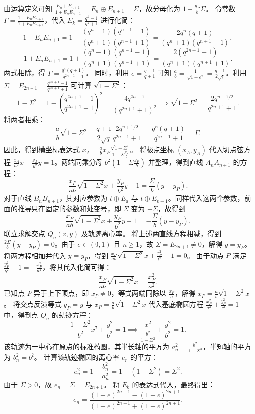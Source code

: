\begin{solution}
由运算定义可知 $\frac{E_n+E_{n+1}}{1+E_n E_{n+1}} = E_n \oplus E_{n+1} = \Sigma$，故分母化为 $1 - \frac{y_P}{b} \Sigma$。
令常数 $\Gamma = \frac{1-E_n E_{n+1}}{1+E_n E_{n+1}}$，代入 $E_k = \frac{q^k-1}{q^k+1}$ 进行化简：
\[ 1-E_n E_{n+1} = 1 - \frac{(q^n-1)(q^{n+1}-1)}{(q^n+1)(q^{n+1}+1)} = \frac{2q^n(q+1)}{(q^n+1)(q^{n+1}+1)}, \]
\[ 1+E_n E_{n+1} = 1 + \frac{(q^n-1)(q^{n+1}-1)}{(q^n+1)(q^{n+1}+1)} = \frac{2(q^{2n+1}+1)}{(q^n+1)(q^{n+1}+1)}. \]
两式相除，得 $\Gamma = \frac{q^n(q+1)}{q^{2n+1}+1}$。
同时，利用 $e = \frac{q-1}{q+1}$ 可知 $\frac{a}{b} = \frac{1}{\sqrt{1-e^2}} = \frac{q+1}{2\sqrt{q}}$。利用 $\Sigma = E_{2n+1} = \frac{q^{2n+1}-1}{q^{2n+1}+1}$ 可计算 $\sqrt{1-\Sigma^2}$：
\[ 1-\Sigma^2 = 1 - \left(\frac{q^{2n+1}-1}{q^{2n+1}+1}\right)^2 = \frac{4q^{2n+1}}{(q^{2n+1}+1)^2} \implies \sqrt{1-\Sigma^2} = \frac{2q^{n+1/2}}{q^{2n+1}+1}. \]
将两者相乘：
\[ \frac{a}{b} \sqrt{1-\Sigma^2} = \frac{q+1}{2\sqrt{q}} \frac{2q^{n+1/2}}{q^{2n+1}+1} = \frac{q^n(q+1)}{q^{2n+1}+1} = \Gamma. \]
因此，得到横坐标表达式 $x_A = \frac{a}{b} x_P \frac{\sqrt{1-\Sigma^2}}{1 - \Sigma\frac{y_P}{b}}$。
将极点坐标 $(x_A, y_A)$ 代入切点弦方程 $\frac{x_A}{a^2}x + \frac{y_A}{b^2}y = 1$。两端同乘分母 $b^2\left(1 - \Sigma\frac{y_P}{b}\right)$ 并整理，得到直线 $A_n A_{n+1}$ 的方程：
\[ \frac{x_P}{ab}\sqrt{1-\Sigma^2} x + \frac{y_P}{b^2}y - 1 = \frac{\Sigma}{b}(y - y_P). \]
对于直线 $B_n B_{n+1}$，其对应参数为 $t \oplus E_n$ 与 $t \oplus E_{n+1}$。同样代入这两个参数，前面的推导只在固定的参数和处变号，即 $\Sigma$ 变为 $-\Sigma$，故得到
\[ \frac{x_P}{ab}\sqrt{1-\Sigma^2} x + \frac{y_P}{b^2}y - 1 = -\frac{\Sigma}{b}(y - y_P). \]
联立求解交点 $Q_n(x,y)$ 及轨迹离心率。
将上述两直线方程相减，得到 $\frac{2\Sigma}{b}(y - y_P) = 0$。由于 $e \in (0, 1)$ 且 $n \ge 1$，故 $\Sigma = E_{2n+1} \neq 0$，解得 $y = y_P$。
将两方程相加并代入 $y = y_P$，得到 $\frac{x_P}{ab}\sqrt{1-\Sigma^2} x + \frac{y_P^2}{b^2} - 1 = 0$。
由于动点 $P$ 满足 $\frac{y_P^2}{b^2} - 1 = -\frac{x_P^2}{a^2}$，将其代入化简可得：
\[ \frac{x_P}{ab}\sqrt{1-\Sigma^2} x = \frac{x_P^2}{a^2}. \]
已知点 $P$ 异于上下顶点，即 $x_P \neq 0$，等式两端同除以 $\frac{x_P}{a}$，解得 $x_P = \frac{a}{b}\sqrt{1-\Sigma^2} x$。
将交点反演等式 $y_P = y$ 与 $x_P = \frac{a}{b}\sqrt{1-\Sigma^2} x$ 代入基底椭圆方程 $\frac{x_P^2}{a^2} + \frac{y_P^2}{b^2} = 1$ 中，得到点 $Q_n$ 的轨迹方程：
\[ \frac{1-\Sigma^2}{b^2} x^2 + \frac{y^2}{b^2} = 1 \implies \frac{x^2}{\frac{b^2}{1-\Sigma^2}} + \frac{y^2}{b^2} = 1. \]
该轨迹为一中心在原点的标准椭圆，其半长轴的平方为 $a_n^2 = \frac{b^2}{1-\Sigma^2}$，半短轴的平方为 $b_n^2 = b^2$。
计算该轨迹椭圆的离心率 $e_n$ 的平方：
\[ e_n^2 = 1 - \frac{b_n^2}{a_n^2} = 1 - (1-\Sigma^2) = \Sigma^2. \]
由于 $\Sigma > 0$，故 $e_n = \Sigma = E_{2n+1}$。
将 $E_k$ 的表达式代入，最终得出：
\[ e_n = \frac{(1+e)^{2n+1} - (1-e)^{2n+1}}{(1+e)^{2n+1} + (1-e)^{2n+1}}. \]

\end{solution}


